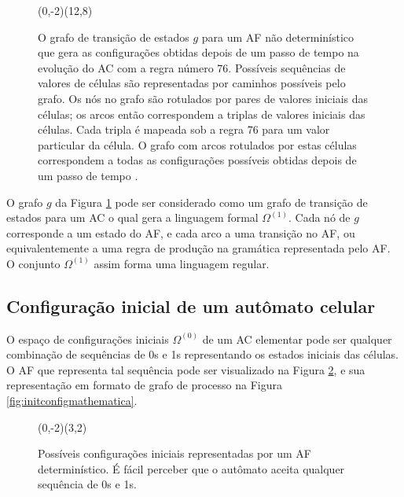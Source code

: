 \documentclass[12pt,a4paper]{article}
\let\vState=\origState
\begin{document}
\begin{figure}[htp]
\begin{center}
\begin{VCPicture}{(0,-2)(12,8)}
\vState[00]{(0,3)}{A} \vState[01]{(6,6)}{B}
\vState[10]{(6,0)}{C} \vState[11]{(12,3)}{D}
 
 
 
 
\end{VCPicture}
\caption{O grafo de transição de estados $g$ para um AF
não determinístico que gera as configurações obtidas depois de um passo
de tempo na evolução do AC com a regra número 76.
Possíveis sequências de valores de células são representadas por
caminhos possíveis pelo grafo. Os nós no grafo são rotulados por pares
de valores iniciais das células; os arcos então correspondem a triplas
de valores iniciais das células. Cada tripla é mapeada sob a regra 76
para um valor particular da célula. O grafo com arcos rotulados por estas
células correspondem a todas as configurações possíveis obtidas depois
de um passo de tempo .}
\label{fig:A1}
\end{center}
\end{figure}

O grafo $g$ da Figura \ref{fig:A1} pode ser considerado como um grafo
de transição de estados para um AC o qual gera a linguagem
formal $\Omega^{(1)}$. Cada nó de $g$ corresponde a um estado do
AF, e cada arco a uma transição no AF, ou
equivalentemente a uma regra  de produção na gramática representada pelo
AF. O conjunto $\Omega^{(1)}$ assim forma uma linguagem
regular.

\subsection{Configuração inicial de um autômato celular}

O espaço de configurações iniciais $\Omega^{(0)}$ de um AC
elementar pode ser qualquer combinação de sequências de 0s e 1s
representando os estados iniciais das células. O AF
que representa tal sequência pode ser visualizado na Figura
\ref{fig:initconfigautomaton}, e sua representação em formato de
grafo de processo na Figura \ref{fig:initconfigmathematica}.

\begin{figure}[htp]
\begin{center}
\begin{VCPicture}{(0,-2)(3,2)}
\end{VCPicture}
\caption{Possíveis configurações iniciais representadas por um AF
determinístico. É fácil perceber que o autômato aceita qualquer sequência de
0s e 1s.}
\label{fig:initconfigautomaton}
\end{center}
\end{figure}
\end{document}
